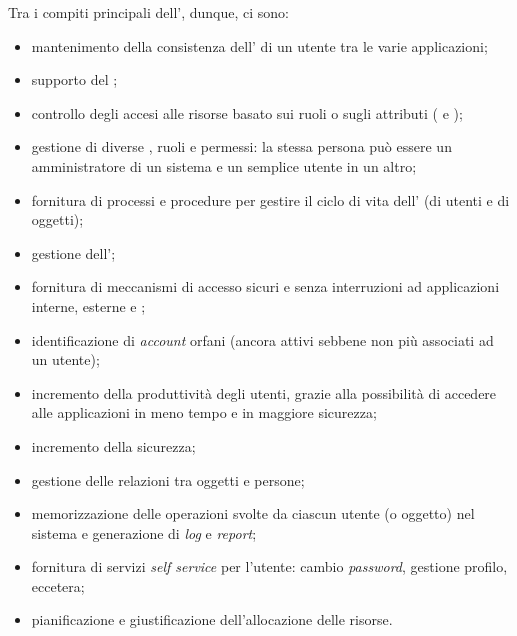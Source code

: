 Tra i compiti principali dell', dunque, ci sono:
\begin{itemize}
\setlength\itemsep{2pt}
\item mantenimento della consistenza dell' di un utente tra le varie applicazioni;
\item supporto del ;
\item controllo degli accesi alle risorse basato sui ruoli o sugli attributi ( e );
\item gestione di diverse , ruoli e permessi: la stessa persona può essere un amministratore di un sistema e un semplice utente in un altro;
\item fornitura di processi e procedure per gestire il ciclo di vita dell' (di utenti e di oggetti);
\item gestione dell';
\item fornitura di meccanismi di accesso sicuri e senza interruzioni ad applicazioni interne, esterne e ;
\item identificazione di \textit{account} orfani (ancora attivi sebbene non più associati ad un utente);
\item incremento della produttività degli utenti, grazie alla possibilità di accedere alle applicazioni in meno tempo e in maggiore sicurezza;
\item incremento della sicurezza;
\item gestione delle relazioni tra oggetti e persone;
\item memorizzazione delle operazioni svolte da ciascun utente (o oggetto) nel sistema e generazione di \textit{log} e \textit{report};
\item fornitura di servizi \textit{self service} per l'utente: cambio \textit{password}, gestione profilo, eccetera;
\item pianificazione e giustificazione dell'allocazione delle risorse.
\end{itemize}